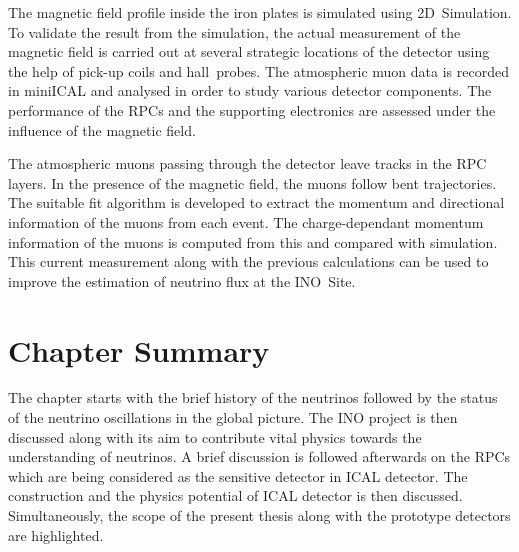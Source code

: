   The magnetic field profile inside the iron plates is simulated using 2D~Simulation. To validate the result from the simulation, the actual measurement of the magnetic field is carried out at several strategic locations of the detector using the help of pick-up coils and hall~probes. The atmospheric muon data is recorded in miniICAL and analysed in order to study various detector components. The performance of the RPCs and the supporting electronics are assessed under the influence of the magnetic field.

  The atmospheric muons passing through the detector leave tracks in the RPC layers. In the presence of the magnetic field, the muons follow bent trajectories. The suitable fit algorithm is developed to extract the momentum and directional information of the muons from each event. The charge-dependant momentum information of the muons is computed from this and compared with simulation. This current measurement along with the previous calculations can be used to improve the estimation of neutrino flux at the INO~Site.

\section{Chapter Summary}
The chapter starts with the brief history of the neutrinos followed by the status of the neutrino oscillations in the global picture. The INO project is then discussed along with its aim to contribute vital physics towards the understanding of neutrinos. A brief discussion is followed afterwards on the RPCs which are being considered as the sensitive detector in ICAL detector. The construction and the physics potential of ICAL detector is then discussed. Simultaneously, the scope of the present thesis along with the prototype detectors are highlighted.

